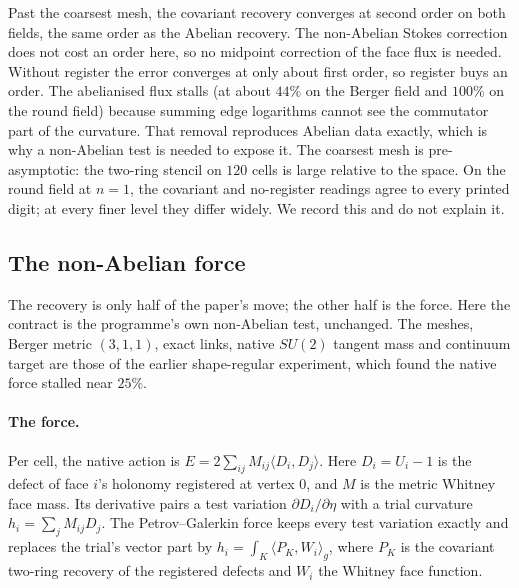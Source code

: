 \documentclass[11pt]{article}
\theoremstyle{definition}
\theoremstyle{remark}
\begin{document}
Past the coarsest mesh, the covariant recovery converges at second order on both fields,
the same order as the Abelian recovery. The non-Abelian Stokes correction does not cost an
order here, so no midpoint correction of the face flux is needed. Without register the
error converges at only about first order, so register buys an order. The abelianised
flux stalls (at about $44\%$ on the Berger field and $100\%$ on the round field) because
summing edge logarithms cannot see the commutator part of the curvature. That removal
reproduces Abelian data exactly, which is why a non-Abelian test is needed to expose it.
The coarsest mesh is pre-asymptotic: the two-ring stencil on $120$ cells is large relative
to the space. On the round field at $n=1$, the covariant and no-register readings agree
to every printed digit; at every finer level they differ widely. We record this and do not
explain it.


\subsection{The non-Abelian force}\label{sec:su2force}

The recovery is only half of the paper's move; the other half is the force. Here the
contract is the programme's own non-Abelian test, unchanged. The meshes, Berger metric
$(3,1,1)$, exact links, native $SU(2)$ tangent mass and continuum target are those of the
earlier shape-regular experiment, which found the native force stalled near $25\%$.

\paragraph{The force.} Per cell, the native action is $E=2\sum_{ij}M_{ij}\langle D_i,D_j\rangle$.
Here $D_i=U_i-1$ is the defect of face $i$'s holonomy registered at vertex $0$, and $M$ is the
metric Whitney face mass. Its derivative pairs a test variation $\partial D_i/\partial\eta$
with a trial curvature $h_i=\sum_jM_{ij}D_j$. The Petrov--Galerkin force keeps every test
variation exactly and replaces the trial's vector part by
$h_i=\int_K\langle P_K,W_i\rangle_g$, where $P_K$ is the covariant two-ring recovery of
the registered defects and $W_i$ the Whitney face function.
\end{document}
